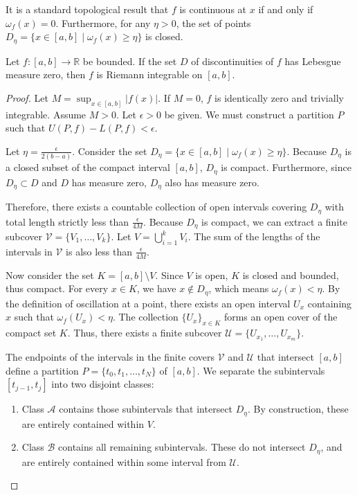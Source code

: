 It is a standard topological result that $f$ is continuous at $x$ if and only if $\omega_f(x) = 0$. Furthermore, for any $\eta > 0$, the set of points $D_\eta = \{ x \in [a, b] \mid \omega_f(x) \ge \eta \}$ is closed.

\begin{theorem}
Let $f: [a, b] \to \mathbb{R}$ be bounded. If the set $D$ of discontinuities of $f$ has Lebesgue measure zero, then $f$ is Riemann integrable on $[a, b]$.
\end{theorem}

\begin{proof}
Let $M = \sup_{x \in [a, b]} |f(x)|$. If $M = 0$, $f$ is identically zero and trivially integrable. Assume $M > 0$. Let $\epsilon > 0$ be given. We must construct a partition $P$ such that $U(P, f) - L(P, f) < \epsilon$.

Let $\eta = \frac{\epsilon}{2(b - a)}$. Consider the set $D_\eta = \{ x \in [a, b] \mid \omega_f(x) \ge \eta \}$. Because $D_\eta$ is a closed subset of the compact interval $[a, b]$, $D_\eta$ is compact. Furthermore, since $D_\eta \subset D$ and $D$ has measure zero, $D_\eta$ also has measure zero. 

Therefore, there exists a countable collection of open intervals covering $D_\eta$ with total length strictly less than $\frac{\epsilon}{4M}$. Because $D_\eta$ is compact, we can extract a finite subcover $\mathcal{V} = \{V_1, \dots, V_k\}$. Let $V = \bigcup_{i=1}^k V_i$. The sum of the lengths of the intervals in $\mathcal{V}$ is also less than $\frac{\epsilon}{4M}$.

Now consider the set $K = [a, b] \setminus V$. Since $V$ is open, $K$ is closed and bounded, thus compact. For every $x \in K$, we have $x \notin D_\eta$, which means $\omega_f(x) < \eta$. By the definition of oscillation at a point, there exists an open interval $U_x$ containing $x$ such that $\omega_f(U_x) < \eta$. The collection $\{U_x\}_{x \in K}$ forms an open cover of the compact set $K$. Thus, there exists a finite subcover $\mathcal{U} = \{U_{x_1}, \dots, U_{x_m}\}$.

The endpoints of the intervals in the finite covers $\mathcal{V}$ and $\mathcal{U}$ that intersect $[a, b]$ define a partition $P = \{t_0, t_1, \dots, t_N\}$ of $[a, b]$. We separate the subintervals $[t_{j-1}, t_j]$ into two disjoint classes:
\begin{enumerate}
    \item Class $\mathcal{A}$ contains those subintervals that intersect $D_\eta$. By construction, these are entirely contained within $V$.
    \item Class $\mathcal{B}$ contains all remaining subintervals. These do not intersect $D_\eta$, and are entirely contained within some interval from $\mathcal{U}$.
\end{enumerate}


\end{proof}
